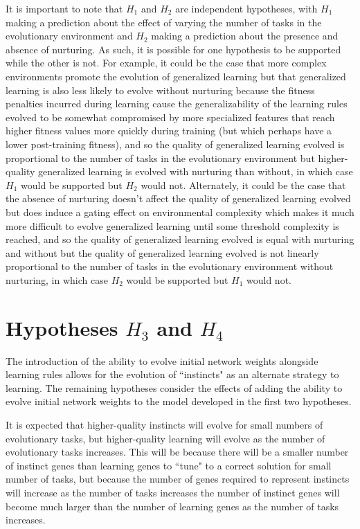 \documentclass[master]{outhesis}
\begin{document}
It is important to note that $H_1$ and $H_2$ are independent hypotheses,
with $H_1$ making a prediction about the effect of varying the number of tasks in the evolutionary environment
and $H_2$ making a prediction about the presence and absence of nurturing.
As such, it is possible for one hypothesis to be supported while the other is not.
For example, 
it could be the case that more complex environments promote the evolution of generalized learning 
but that generalized learning is also less likely to evolve without nurturing because the fitness penalties incurred during learning cause the generalizability of the learning rules evolved to be somewhat compromised by more specialized features that reach higher fitness values more quickly during training (but which perhaps have a lower post-training fitness),
and so the quality of generalized learning evolved is proportional to the number of tasks in the evolutionary environment
but higher-quality generalized learning is evolved with nurturing than without,
in which case $H_1$ would be supported but $H_2$ would not.
Alternately,
it could be the case that the absence of nurturing doesn't affect the quality of generalized learning evolved
but does induce a gating effect on environmental complexity which makes it much more difficult to evolve generalized learning until some threshold complexity is reached,
and so the quality of generalized learning evolved is equal with nurturing and without
but the quality of generalized learning evolved is not linearly proportional to the number of tasks in the evolutionary environment without nurturing,
in which case $H_2$ would be supported but $H_1$ would not. 

\section{Hypotheses $H_3$ and $H_4$}

The introduction of the ability to evolve initial network weights alongside learning rules allows for the evolution of ``instincts" as an alternate strategy to learning. The remaining hypotheses consider the effects of adding the ability to evolve initial network weights to the model developed in the first two hypotheses.

It is expected that higher-quality instincts will evolve for small numbers of evolutionary tasks, but higher-quality learning will evolve as the number of evolutionary tasks increases.
This will be because there will be a smaller number of instinct genes than learning genes to ``tune" to a correct solution for small number of tasks, but because the number of genes required to represent instincts will increase as the number of tasks increases the number of instinct genes will become much larger than the number of learning genes as the number of tasks increases.
\end{document}
